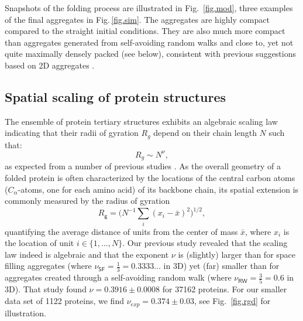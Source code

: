 \documentclass[9pt]{elife}
\begin{document}
Snapshots of the folding process are illustrated in Fig.~\ref{fig.mod}, three examples of the final aggregates in Fig.\,\ref{fig.sim}. The aggregates are highly compact compared to the straight initial conditions. They are also much more compact than aggregates generated from self-avoiding random walks and close to, yet not quite maximally densely packed (see below), consistent with previous suggestions based on 2D aggregates \cite{molkenthin2016scaling}. 

\subsection{Spatial scaling of protein structures}
The ensemble of protein tertiary structures exhibits an algebraic scaling law indicating that their radii of gyration $R_g$ 
depend on their chain length $N$ such that:
\begin{equation}
    R_g \sim N^\nu,
\end{equation}
as expected from a number of previous studies \cite{Danielsson2010,Molkenthin2011,Hong2013, molkenthin2016scaling}.
As the overall geometry of a folded protein is often characterized by the locations of the central carbon atoms ($C_\alpha$-atoms, one for each amino acid) of its backbone chain, its spatial extension is commonly measured by the radius of gyration 
\begin{equation}
 R_\mathsf{g}=\Big(N^{-1}\sum_{i}(x_i-\bar{x})^2 \Big)^{1/2},
 \label{eq.RG}
\end{equation}
quantifying the average distance of units from the center of mass $\bar{x}$, where $x_i$ is the location of unit $i \in \{1,\ldots,N\}$. Our previous study \cite{molkenthin2016scaling} revealed that the scaling law indeed is algebraic and that the exponent $\nu$ is (slightly) larger than for space filling aggregates (where $\nu_{\textsf{SF}}=\tfrac{1}{3}=0.3333\ldots$ in 3D) yet (far) smaller than for aggregates created through a self-avoiding random walk (where $\nu_{\textsf{RW}}=\tfrac{3}{5}=0.6$ in 3D). That study found $\nu=0.3916 \pm 0.0008$ for 37162 proteins. For our smaller data set of 1122 proteins, we find 
$\nu_{exp}=0.374 \pm 0.03$, see Fig.~\ref{fig.rgd} for illustration.
\end{document}
